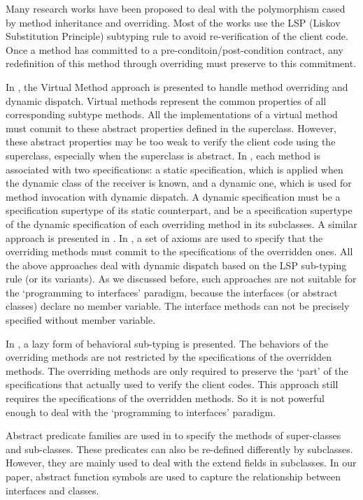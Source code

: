 \documentclass[fleqn]{llncs}
\begin{document}
Many research works have been proposed to deal with the polymorphism cased by method inheritance and overriding.
Most of the works use the LSP (Liskov Substitution Principle) subtyping rule \cite{Liskov:1994:BNS:197320.197383} to avoid re-verification of the client code.
Once a method has committed to a pre-conditoin/post-condition contract, any redefinition of
this method through overriding must preserve to this commitment.

In \cite{DBLP:conf/esop/Poetzsch-HeffterM99}, the Virtual Method approach is presented to handle method overriding and dynamic dispatch.
Virtual methods represent the common properties of all corresponding subtype methods. All the implementations of a virtual method
must commit to these abstract properties defined in the superclass. However, these abstract properties may be too weak to
verify the client code using the superclass, especially when the superclass is abstract. In \cite{DBLP:conf/popl/ChinDNQ08}, each
method is associated with two specifications: a static specification, which is applied when the dynamic class of the receiver is known,
and a dynamic one, which is used for method invocation with dynamic dispatch. A dynamic specification must be a specification supertype of its static
counterpart, and be a specification supertype of the dynamic specification of each overriding method in its subclasses. A similar
approach is presented in \cite{Parkinson2008}. In \cite{DBLP:journals/fac/SmansJPS10}, a set of axioms are used to specify that the overriding methods must commit to
the specifications of the overridden ones. All the above approaches deal with dynamic dispatch based on the LSP sub-typing rule
(or its variants). As we discussed before, such approaches are not suitable for the `programming to interfaces' paradigm, because the interfaces
(or abstract classes) declare no member variable. The interface methods can not be precisely specified without member variable.

In \cite{DBLP:journals/jlp/DovlandJOS10}\cite{DBLP:journals/scp/DovlandJOS11}, a lazy form of behavioral sub-typing is presented.
The behaviors of the overriding methods are not restricted by the specifications of the overridden methods.
The overriding methods are only required to preserve the `part' of the specifications that actually used to verify the
client codes. This approach still requires the specifications of the overridden methods. So it is not powerful enough to deal with the
`programming to interfaces' paradigm.


Abstract predicate families are used in \cite{Parkinson2008} to specify the methods of super-classes and sub-classes.
These predicates can also be re-defined differently by subclasses. However, they are mainly used to deal with the extend fields in subclasses.
In our paper, abstract function symbols are used to capture the relationship between interfaces and classes.
\end{document}
